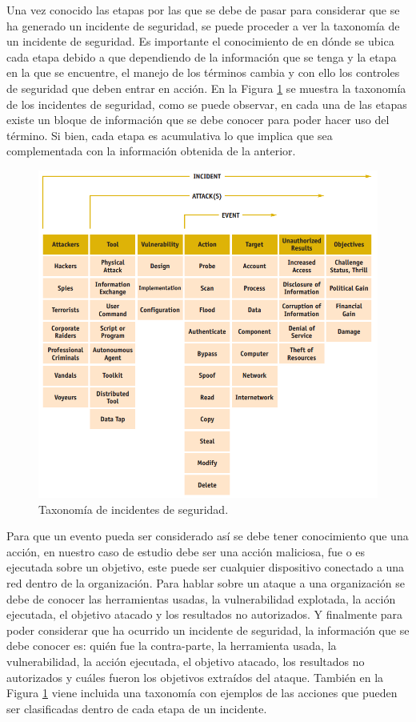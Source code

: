 Una vez conocido las etapas por las que se debe de pasar para considerar que se ha generado un incidente de seguridad, se puede proceder a ver la taxonomía de un incidente de seguridad. Es importante el conocimiento de en dónde se ubica cada etapa debido a que dependiendo de la información que se tenga y la etapa en la que se encuentre, el manejo de los términos cambia y con ello los controles de seguridad que deben entrar en acción. En la Figura \ref{fig:tax_seg} se muestra la taxonomía de los incidentes de seguridad, como se puede observar, en cada una de las etapas existe un bloque de información que se debe conocer para poder hacer uso del término. Si bien, cada etapa es acumulativa lo que implica que sea complementada con la información obtenida de la anterior. \\

\begin{figure}
	\centering
	\includegraphics[scale=.4]{images/taxonomia_incidente}
	\caption{Taxonomía de incidentes de seguridad.}
	\label{fig:tax_seg}
\end{figure}


Para que un evento pueda ser considerado así se debe tener conocimiento que una acción, en nuestro caso de estudio debe ser una acción maliciosa, fue o es ejecutada sobre un objetivo, este puede ser cualquier dispositivo conectado a una red dentro de la organización. Para hablar sobre un ataque a una organización se debe de conocer las herramientas usadas, la vulnerabilidad explotada, la acción ejecutada, el objetivo atacado y los resultados no autorizados. Y finalmente para poder considerar que ha ocurrido un incidente de seguridad, la información que se debe conocer es: quién fue la contra-parte, la herramienta usada, la vulnerabilidad, la acción ejecutada, el objetivo atacado, los resultados no autorizados y cuáles fueron los objetivos extraídos del ataque. También en la Figura \ref{fig:tax_seg} viene incluida una taxonomía con ejemplos de las acciones que pueden ser clasificadas dentro de cada etapa de un incidente.\\